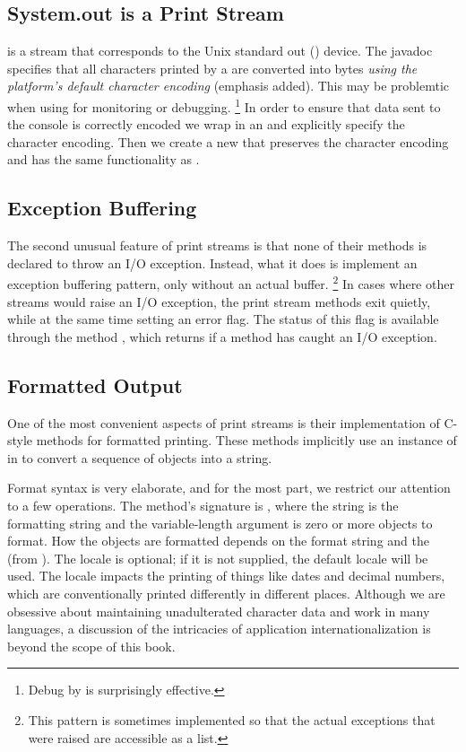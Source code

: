 \subsection{System.out is a Print Stream}\label{section:system-out}

 is a  stream that corresponds to the Unix standard out () device.
The javadoc specifies that all characters printed by a  are converted
into bytes \emph{using the platform's default character encoding} (emphasis added).
This may be problemtic when using  for monitoring or debugging.%
%
\footnote{Debug by  is surprisingly effective.}
%
In order to ensure that data sent to the console is correctly encoded we wrap  in an
 and explicitly specify the character encoding.  Then we create a new 
that preserves the character encoding and has the same functionality as .
%
%


\subsection{Exception Buffering}

The second unusual feature of print streams is that none of their
methods is declared to throw an I/O exception.  Instead, what it does
is implement an exception buffering pattern, only without an actual
buffer.%
%
\footnote{This pattern is sometimes implemented so
that the actual exceptions that were raised are accessible as a list.}
%
In cases where other streams would raise an I/O exception, the print
stream methods exit quietly, while at the same time setting an error
flag.  The status of this flag is available through the method
, which returns  if a method has caught
an I/O exception.

\subsection{Formatted Output}

One of the most convenient aspects of print streams is their
implementation of C-style  methods for formatted
printing.  These methods implicitly use an instance of
 in  to convert a sequence of objects
into a string.  

Format syntax is very elaborate, and for the most part, we restrict
our attention to a few operations.  The method's signature is
, where the string is the
formatting string and the variable-length argument 
is zero or more objects to format.  How the objects are formatted
depends on the format string and the  (from
).  The locale is optional; if it is not supplied, the
default locale will be used.  The locale impacts the printing of
things like dates and decimal numbers, which are conventionally
printed differently in different places.  Although we are obsessive
about maintaining unadulterated character data and work in many
languages, a discussion of the intricacies of application
internationalization is beyond the scope of this book.


